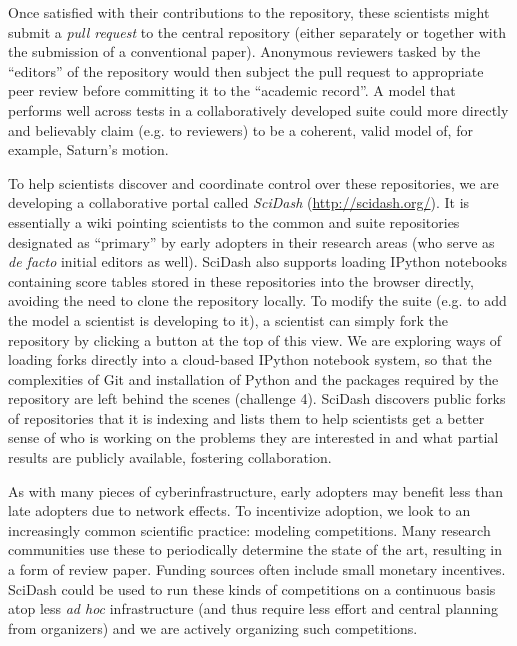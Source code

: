 \documentclass[9pt]{sig-alternate}
\begin{document}
Once satisfied with their contributions to the repository, these scientists might submit a \emph{pull request} to the central repository (either separately or together with the submission of a conventional paper). Anonymous reviewers tasked by the ``editors'' of the repository would then subject the pull request to appropriate peer review before committing it to the ``academic record''. A model that performs well across tests in a collaboratively developed suite could more directly and believably claim (e.g. to reviewers) to be a coherent, valid model of, for example, Saturn's motion. 



To help scientists discover and coordinate control over these repositories, we are developing a collaborative portal called \textit{SciDash} (\url{http://scidash.org/}). It is essentially a wiki pointing scientists to the common and suite repositories designated as ``primary'' by early adopters in their research areas (who serve as \emph{de facto} initial editors as well). SciDash also supports loading IPython notebooks containing score tables stored in these repositories into the browser directly, avoiding the need to clone the repository locally. To modify the suite (e.g. to add the model a scientist is developing to it), a scientist can simply fork the repository by clicking a button at the top of this view. We are exploring ways of loading forks directly into a cloud-based IPython notebook system, so that the complexities of Git and installation of Python and the packages required by the repository are left behind the scenes (challenge 4). SciDash discovers public forks of repositories that it is indexing and lists them to help scientists get a better sense of who is working on the problems they are interested in and what partial results are publicly available, fostering collaboration.

As with many pieces of cyberinfrastructure, early adopters may benefit less than late adopters due to network effects. To incentivize adoption, we look to an increasingly common scientific practice: modeling competitions. Many research communities use these to periodically determine the state of the art, resulting in a form of review paper. Funding sources often include small monetary incentives.
   SciDash could be used to run these kinds of competitions on a continuous basis atop less \textit{ad hoc} infrastructure (and thus require less effort and central planning from organizers) and we are actively organizing such competitions.
\end{document}

